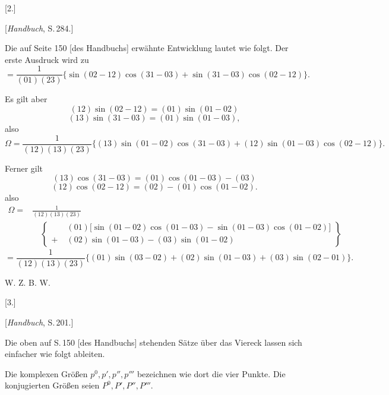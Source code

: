 
\begin{center}
[2.]

[\emph{Handbuch}, S.\,284.]
\end{center}

Die auf Seite 150 [des Handbuchs] erwähnte Entwicklung lautet wie folgt. Der erste Ausdruck wird zu
\[
= \frac{1}{(01)(23)}\{\sin(02-12)\cos(31-03)+\sin(31-03)\cos(02-12)\}.
\]

Es gilt aber
\[
(12)\sin(02-12) = (01)\sin(01-02)
\]
\[
(13)\sin(31-03) = (01)\sin(01-03),
\]
also
\[
\Omega = \frac{1}{(12)(13)(23)}\{(13)\sin(01-02)\cos(31-03)+(12)\sin(01-03)\cos(02-12)\}.
\]

Ferner gilt
\[
(13)\cos(31-03) = (01)\cos(01-03)-(03)
\]
\[
(12)\cos(02-12) = (02)-(01)\cos(01-02).
\]
also
\[
\begin{aligned}
\Omega ={}& \frac{1}{(12)(13)(23)}\\
&\quad\left\{
\begin{aligned}
&(01)\big[\sin(01-02)\cos(01-03)-\sin(01-03)\cos(01-02)\big]\\
+\;&(02)\sin(01-03)-(03)\sin(01-02)
\end{aligned}
\right\}
\end{aligned}
\]
\[
= \frac{1}{(12)(13)(23)}\{(01)\sin(03-02)+(02)\sin(01-03)+(03)\sin(02-01)\}.
\]

\begin{center}
W. Z. B. W.

[3.]

[\emph{Handbuch}, S.\,201.]
\end{center}

Die oben auf S.\,150 [des Handbuchs] stehenden Sätze über das Viereck lassen sich einfacher wie folgt ableiten.

Die komplexen Größen $p^0, p', p'', p'''$ bezeichnen wie dort die vier Punkte. Die konjugierten Größen seien $P^0, P', P'', P'''$.
